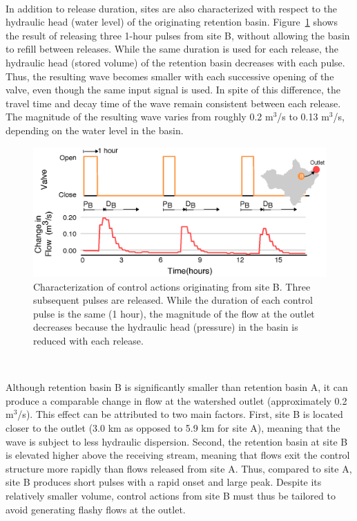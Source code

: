 \

In addition to release duration, sites are also characterized with respect to the hydraulic head (water level) of the originating retention basin. Figure~\ref{fig-ch2:4} shows the result of releasing three 1-hour pulses from site B, without allowing the basin to refill between releases. While the same duration is used for each release, the hydraulic head (stored volume) of the retention basin decreases with each pulse. Thus, the resulting wave becomes smaller with each successive opening of the valve, even though the same input signal is used. In spite of this difference, the travel time and decay time of the wave remain consistent between each release.
The magnitude of the resulting wave varies from roughly 0.2 m$^3$/s to 0.13 m$^3$/s, depending on the water level in the basin. 

\begin{figure}
    \centering
    \includegraphics[width=\textwidth]{gfx/Chapter-2/Figure5_F.eps}
    \caption{Characterization of control actions originating from site B. Three subsequent pulses are released. While the duration of each control pulse is the same (1 hour), the magnitude of the flow
    at the outlet decreases because the hydraulic head (pressure) in the basin is reduced with each release.
    }\label{fig-ch2:4}
\end{figure}

\

Although retention basin B is significantly smaller than retention basin A, it can produce a comparable change in flow at the watershed outlet (approximately 0.2 m$^3$/s). This effect can be attributed to two main factors. First, site B is located closer to the outlet (3.0 km as opposed to 5.9 km for site A), meaning that the wave is subject to less hydraulic dispersion. Second, the retention basin at site B is elevated higher above the receiving stream, meaning that flows exit the control structure more rapidly than flows released from site A. Thus, compared to site A, site B produces short pulses with a rapid onset and large peak. Despite its relatively smaller volume, control actions from site B must thus be tailored to avoid generating flashy flows at the outlet.

